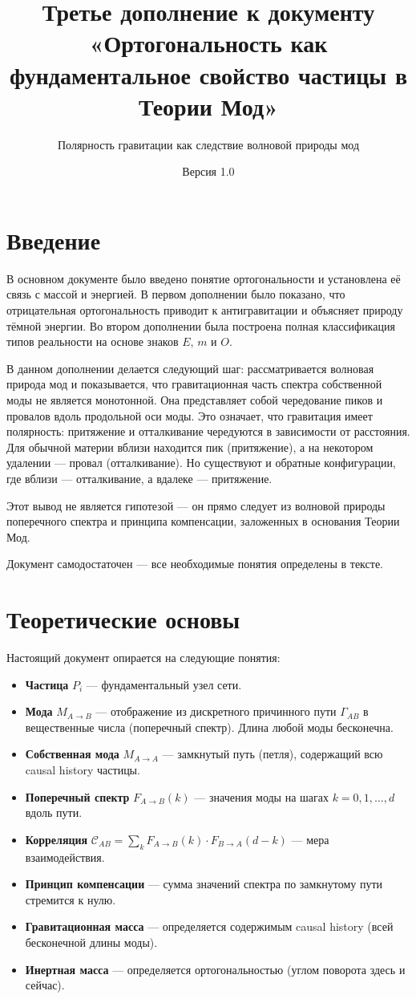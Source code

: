 \documentclass[12pt,a4paper]{article}
\title{\textbf{Третье дополнение к документу}\\
\large «Ортогональность как фундаментальное свойство частицы в Теории Мод»}
\subtitle{Полярность гравитации как следствие волновой природы мод}
\author{}
\date{Версия 1.0}
\begin{document}
\maketitle

\section{Введение}
В основном документе было введено понятие ортогональности и установлена её связь с массой и энергией. В первом дополнении было показано, что отрицательная ортогональность приводит к антигравитации и объясняет природу тёмной энергии. Во втором дополнении была построена полная классификация типов реальности на основе знаков $E$, $m$ и $O$.

В данном дополнении делается следующий шаг: рассматривается волновая природа мод и показывается, что гравитационная часть спектра собственной моды не является монотонной. Она представляет собой чередование пиков и провалов вдоль продольной оси моды. Это означает, что гравитация имеет полярность: притяжение и отталкивание чередуются в зависимости от расстояния. Для обычной материи вблизи находится пик (притяжение), а на некотором удалении --- провал (отталкивание). Но существуют и обратные конфигурации, где вблизи --- отталкивание, а вдалеке --- притяжение.

Этот вывод не является гипотезой --- он прямо следует из волновой природы поперечного спектра и принципа компенсации, заложенных в основания Теории Мод.

Документ самодостаточен --- все необходимые понятия определены в тексте.

\section{Теоретические основы}
Настоящий документ опирается на следующие понятия:

\begin{itemize}
    \item \textbf{Частица} $P_i$ --- фундаментальный узел сети.
    \item \textbf{Мода} $M_{A \to B}$ --- отображение из дискретного причинного пути $\Gamma_{AB}$ в вещественные числа (поперечный спектр). Длина любой моды бесконечна.
    \item \textbf{Собственная мода} $M_{A \to A}$ --- замкнутый путь (петля), содержащий всю causal history частицы.
    \item \textbf{Поперечный спектр} $F_{A \to B}(k)$ --- значения моды на шагах $k = 0, 1, \dots, d$ вдоль пути.
    \item \textbf{Корреляция} $\mathcal{C}_{AB} = \sum_k F_{A \to B}(k) \cdot F_{B \to A}(d-k)$ --- мера взаимодействия.
    \item \textbf{Принцип компенсации} --- сумма значений спектра по замкнутому пути стремится к нулю.
    \item \textbf{Гравитационная масса} --- определяется содержимым causal history (всей бесконечной длины моды).
    \item \textbf{Инертная масса} --- определяется ортогональностью (углом поворота здесь и сейчас).
\end{itemize}
\end{document}
